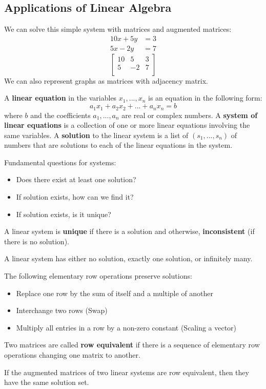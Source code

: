 \documentclass[11pt]{scrartcl}
\theoremstyle{dotlessP}
\theoremstyle{dotlessN}
\begin{document}
\subsection{Applications of Linear Algebra}
We can solve this simple system with matrices and augmented matrices:
\begin{align*}
	10x + 5y &= 3 \\
	5x - 2y &= 7
\end{align*}
\[
\begin{bmatrix}
	10 & 5 & 3 \\
	5 & -2 & 7 \\
\end{bmatrix}
\]
We can also represent graphs as matrices with adjacency matrix.
\begin{definition}
	 A \textbf{linear equation} in the variables $x_1,...,x_n$ is an equation in the following form:
	\[
	a_1x_1 + a_2x_2 + ... + a_n x_n = b
	\] 
	where $b$ and the coefficients $a_1, ..., a_n$ are real or complex numbers. A \textbf{system of linear equations} is a collection of one or more linear equations involving the same variables. A \textbf{solution} to the linear system is a list of $(s_1,...,s_n)$ of numbers that are solutions to each of the linear equations in the system.
\end{definition}
Fundamental questions for systems:
\begin{itemize}
	\item Does there exist at least one solution?
	\item If solution exists, how can we find it?
	\item If solution exists, is it unique?
\end{itemize}
\begin{definition}
	A linear system is \textbf{unique} if there is a solution and otherwise, \textbf{inconsistent} (if there is no solution).
\end{definition}
\begin{fact}
	A linear system has either no solution, exactly one solution, or infinitely many.	
\end{fact}
\begin{definition}
	The following elementary row operations preserve solutions:
	\begin{itemize}
		\item Replace one row by the sum of itself and a multiple of another	
		\item Interchange two rows (Swap)
		\item Multiply all entries in a row by a non-zero constant (Scaling a vector)
	\end{itemize}
\end{definition}
\begin{definition}
	Two matrices are called \textbf{row equivalent} if there is a sequence of elementary row operations changing one matrix to another.
\end{definition}
\begin{fact}
	If the augmented matrices of two linear systems are row equivalent, then they have the same solution set.
\end{fact}
\end{document}
